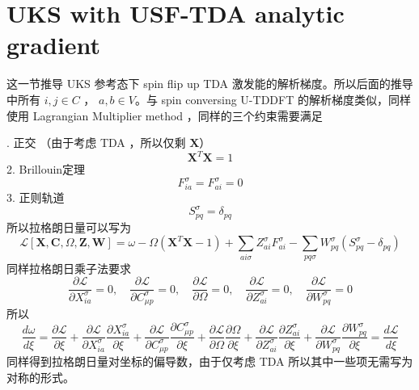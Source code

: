 \documentclass[11pt]{ctexart}
\numberwithin{equation}{section}
\begin{document}
\section{UKS with USF-TDA analytic gradient}
这一节推导 UKS 参考态下 spin flip up TDA 激发能的解析梯度。所以后面的推导中所有 $i,j\in C$ ， $a,b\in V$。与 spin conversing U-TDDFT 的解析梯度类似，同样使用 Lagrangian Multiplier method ，同样的三个约束需要满足

. 正交 （由于考虑 TDA ，所以仅剩 $\mathbf{X}$）
\begin{equation}
    \mathbf{X}^{T}\mathbf{X} = 1
\end{equation}
2. Brillouin定理
\begin{equation}
    F_{ia}^{\sigma} = F_{ai}^{\sigma} = 0
\end{equation}
3. 正则轨道
\begin{equation}
    S_{pq}^{\sigma} = \delta_{pq}
\end{equation}
所以拉格朗日量可以写为
\begin{equation}
    \mathcal{L}[\mathbf{X}, \mathbf{C}, \Omega, \mathbf{Z}, \mathbf{W}]
    = \omega 
    - \Omega(\mathbf{X}^{T}\mathbf{X} - 1)
    + \sum_{ai\sigma}Z_{ai}^{\sigma}F_{ai}^{\sigma}
    - \sum_{pq\sigma}W_{pq}^{\sigma}(S_{pq}^{\sigma}-\delta_{pq})
\end{equation}
同样拉格朗日乘子法要求
\begin{equation}
    \frac{\partial \mathcal{L}}{\partial X_{ia}^{\sigma}} = 0,
    \quad \frac{\partial \mathcal{L}}{\partial C_{\mu p}^{\sigma}} = 0,
    \quad \frac{\partial \mathcal{L}}{\partial \Omega} = 0 ,
    \quad \frac{\partial \mathcal{L}}{\partial Z_{ai}^{\sigma}} = 0 ,
    \quad \frac{\partial \mathcal{L}}{\partial W_{pq}^{\sigma}} = 0 
\end{equation}
所以
\begin{equation}
    \frac{d \omega}{d \xi} 
    = \frac{\partial\mathcal{L}}{\partial \xi}
    + \frac{\partial\mathcal{L}}{\partial X_{ia}^{\sigma}}\frac{\partial X_{ia}^{\sigma}}{\partial \xi}
    + \frac{\partial\mathcal{L}}{\partial C_{\mu p}^{\sigma}}\frac{\partial C_{\mu p}^{\sigma}}{\partial \xi}
    + \frac{\partial\mathcal{L}}{\partial \Omega}\frac{\partial \Omega}{\partial \xi}
    + \frac{\partial\mathcal{L}}{\partial Z_{ai}^{\sigma}}\frac{\partial Z_{ai}^{\sigma}}{\partial \xi}
    + \frac{\partial\mathcal{L}}{\partial W_{pq}^{\sigma}}\frac{\partial W_{pq}^{\sigma}}{\partial \xi}
    = \frac{d \mathcal{L}}{d\xi}
\end{equation}
同样得到拉格朗日量对坐标的偏导数，由于仅考虑 TDA 所以其中一些项无需写为对称的形式。
\end{document}
